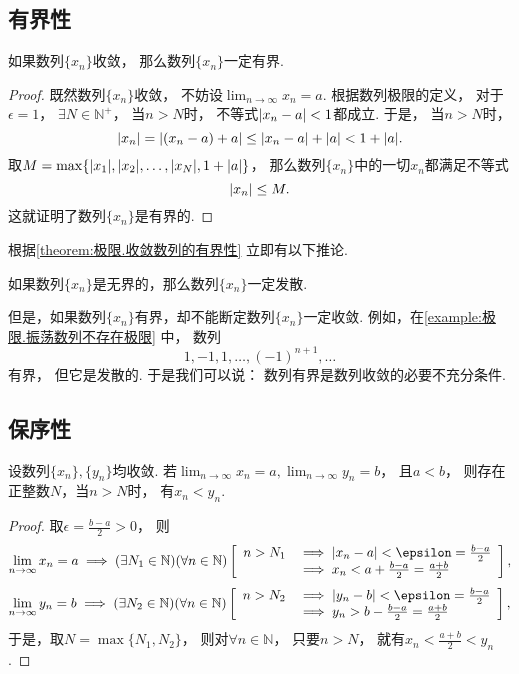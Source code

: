 \subsection{有界性}
\begin{theorem}[有界性]\label{theorem:极限.收敛数列的有界性}
如果数列\(\{x_n\}\)收敛，
那么数列\(\{x_n\}\)一定有界.
\begin{proof}
既然数列\(\{x_n\}\)收敛，
不妨设\(\lim_{n\to\infty}x_n = a\).
根据数列极限的定义，
对于\(\epsilon = 1\)，
\(\exists N \in \mathbb{N}^+\)，
当\(n > N\)时，
不等式\(\abs{x_n - a} < 1\)都成立.
于是，
当\(n > N\)时，
\[
	\abs{x_n} = \abs{(x_n - a) + a} \leq \abs{x_n - a} + \abs{a} < 1 + \abs{a}.
\]
取\(M = \max\{\abs{x_1},\abs{x_2},\dotsc,\abs{x_N},1+\abs{a}\}\)，
那么数列\(\{x_n\}\)中的一切\(x_n\)都满足不等式\[
	\abs{x_n} \leq M.
\]
这就证明了数列\(\{x_n\}\)是有界的.
\end{proof}
\end{theorem}

根据\cref{theorem:极限.收敛数列的有界性} 立即有以下推论.
\begin{corollary}
如果数列\(\{x_n\}\)是无界的，那么数列\(\{x_n\}\)一定发散.
\end{corollary}
但是，如果数列\(\{x_n\}\)有界，却不能断定数列\(\{x_n\}\)一定收敛.
例如，在\cref{example:极限.振荡数列不存在极限} 中，
数列\[
	1,-1,1,\dotsc,(-1)^{n+1},\dotsc
\]有界，
但它是发散的.
于是我们可以说：
数列有界是数列收敛的必要不充分条件.

\subsection{保序性}
\begin{theorem}[保序性]\label{theorem:极限.收敛数列的保序性}
设数列\(\{x_n\},\{y_n\}\)均收敛.
若\(\lim_{n\to\infty} x_n = a,
\lim_{n\to\infty} y_n = b\)，
且\(a < b\)，
则存在正整数\(N\)，当\(n>N\)时，
有\(x_n < y_n\).
\begin{proof}
取\(\epsilon=\frac{b-a}2>0\)，
则\[
	\lim_{n\to\infty} x_n = a
	\implies
	(\exists N_1\in\mathbb{N})(\forall n\in\mathbb{N})
	\left[
		\begin{array}{rl}
			n>N_1
			&\implies
			\abs{x_n - a} < \epsilon = \frac{b-a}2 \\
			&\implies
			x_n < a + \frac{b-a}2 = \frac{a+b}2
		\end{array}
	\right],
\]\[
	\lim_{n\to\infty} y_n = b
	\implies
	(\exists N_2\in\mathbb{N})(\forall n\in\mathbb{N})
	\left[
		\begin{array}{rl}
			n>N_2
			&\implies
			\abs{y_n - b} < \epsilon = \frac{b-a}2 \\
			&\implies
			y_n > b - \frac{b-a}2 = \frac{a+b}2
		\end{array}
	\right],
\]
于是，取\(N = \max\{N_1,N_2\}\)，
则对\(\forall n\in\mathbb{N}\)，
只要\(n>N\)，
就有\(x_n < \frac{a+b}2 < y_n\).
\end{proof}
\end{theorem}

